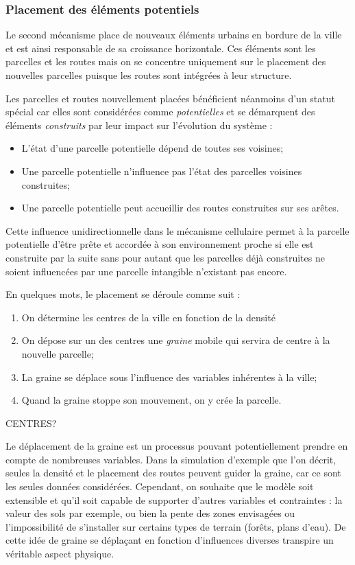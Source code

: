 \documentclass[12pt]{article}
\begin{document}
\subsubsection{Placement des éléments potentiels}

Le second mécanisme place de nouveaux éléments urbains en bordure de
la ville et est ainsi responsable de sa croissance horizontale. Ces
éléments sont les parcelles et les routes mais on se concentre
uniquement sur le placement des nouvelles parcelles puisque les routes
sont intégrées à leur structure.

Les parcelles et routes nouvellement placées bénéficient néanmoins
d'un statut spécial car elles sont considérées comme
\textit{potentielles} et se démarquent des éléments
\textit{construits} par leur impact sur l'évolution du système :

\begin{itemize}
\item{L'état d'une parcelle potentielle dépend de toutes ses voisines;}
\item{Une parcelle potentielle n'influence pas l'état des parcelles
  voisines construites;}
\item{Une parcelle potentielle peut accueillir des routes construites
  sur ses arêtes.}
\end{itemize}

Cette influence unidirectionnelle dans le mécanisme cellulaire permet
à la parcelle potentielle d'être prête et accordée à son environnement
proche si elle est construite par la suite sans pour autant que les
parcelles déjà construites ne soient influencées par une parcelle
intangible n'existant pas encore.

En quelques mots, le placement se déroule comme suit :

\begin{enumerate}
\item{On détermine les centres de la ville en fonction de la densité}
\item{On dépose sur un des centres une \textit{graine} mobile qui
  servira de centre à la nouvelle parcelle;}
\item{La graine se déplace sous l'influence des variables inhérentes à
  la ville;}
\item{Quand la graine stoppe son mouvement, on y crée la parcelle.}
\end{enumerate}

CENTRES?

Le déplacement de la graine est un processus pouvant potentiellement
prendre en compte de nombreuses variables. Dans la simulation
d'exemple que l'on décrit, seules la densité et le placement des
routes peuvent guider la graine, car ce sont les seules données
considérées. Cependant, on souhaite que le modèle soit extensible et
qu'il soit capable de supporter d'autres variables et contraintes : la
valeur des sols par exemple, ou bien la pente des zones envisagées ou
l'impossibilité de s'installer sur certains types de terrain (forêts,
plans d'eau). De cette idée de graine se déplaçant en fonction
d'influences diverses transpire un véritable aspect physique.
\end{document}
